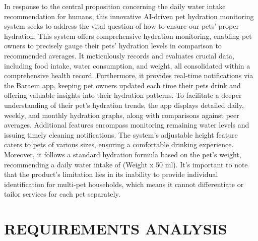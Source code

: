 \documentclass[conference]{IEEEtran}
\begin{document}
In response to the central proposition concerning the daily water intake recommendation for humans, this innovative AI-driven pet hydration monitoring system seeks to address the vital question of how to ensure our pets' proper hydration. This system offers comprehensive hydration monitoring, enabling pet owners to precisely gauge their pets' hydration levels in comparison to recommended averages. It meticulously records and evaluates crucial data, including food intake, water consumption, and weight, all consolidated within a comprehensive health record. Furthermore, it provides real-time notifications via the Baraem app, keeping pet owners updated each time their pets drink and offering valuable insights into their hydration patterns. To facilitate a deeper understanding of their pet's hydration trends, the app displays detailed daily, weekly, and monthly hydration graphs, along with comparisons against peer averages. Additional features encompass monitoring remaining water levels and issuing timely cleaning notifications. The system's adjustable height feature caters to pets of various sizes, ensuring a comfortable drinking experience. Moreover, it follows a standard hydration formula based on the pet's weight, recommending a daily water intake of (Weight x 50 ml). It's important to note that the product's limitation lies in its inability to provide individual identification for multi-pet households, which means it cannot differentiate or tailor services for each pet separately.
\newline

\newpage

\section{REQUIREMENTS ANALYSIS}
\end{document}
